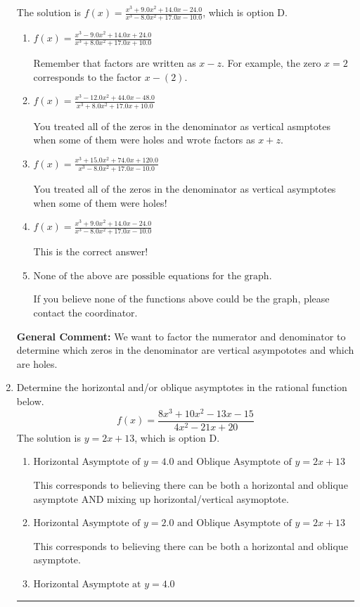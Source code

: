 \documentclass{extbook}[14pt]
\newcommand{\litem}[1]{\item #1

\rule{\textwidth}{0.4pt}}
\begin{document}
\begin{enumerate}
{The solution is \( f(x)=\frac{x^{3} +9.0 x^{2} +14.0 x -24.0}{x^{3} -8.0 x^{2} +17.0 x -10.0} \), which is option D.\begin{enumerate}[label=\Alph*.]
\item \( f(x)=\frac{x^{3} -9.0 x^{2} +14.0 x + 24.0}{x^{3} +8.0 x^{2} +17.0 x + 10.0} \)

Remember that factors are written as $x-z$. For example, the zero $x=2$ corresponds to the factor $x-(2)$.
\item \( f(x)=\frac{x^{3} -12.0 x^{2} +44.0 x -48.0}{x^{3} +8.0 x^{2} +17.0 x + 10.0} \)

You treated all of the zeros in the denominator as vertical asmptotes when some of them were holes and wrote factors as $x+z$.
\item \( f(x)=\frac{x^{3} +15.0 x^{2} +74.0 x + 120.0}{x^{3} -8.0 x^{2} +17.0 x -10.0} \)

You treated all of the zeros in the denominator as vertical asymptotes when some of them were holes!
\item \( f(x)=\frac{x^{3} +9.0 x^{2} +14.0 x -24.0}{x^{3} -8.0 x^{2} +17.0 x -10.0} \)

This is the correct answer!
\item \( \text{None of the above are possible equations for the graph.} \)

If you believe none of the functions above could be the graph, please contact the coordinator.
\end{enumerate}

\textbf{General Comment:} We want to factor the numerator and denominator to determine which zeros in the denominator are vertical asympototes and which are holes.
}
\litem{
Determine the horizontal and/or oblique asymptotes in the rational function below.
\[ f(x) = \frac{8x^{3} +10 x^{2} -13 x -15}{4x^{2} -21 x + 20} \]The solution is \( y = 2x + 13 \), which is option D.\begin{enumerate}[label=\Alph*.]
\item \( \text{Horizontal Asymptote of } y = 4.0 \text{ and Oblique Asymptote of } y = 2x + 13 \)

This corresponds to believing there can be both a horizontal and oblique asymptote AND mixing up horizontal/vertical asymoptote.
\item \( \text{Horizontal Asymptote of } y = 2.0 \text{ and Oblique Asymptote of } y = 2x + 13 \)

This corresponds to believing there can be both a horizontal and oblique asymptote.
\item \( \text{Horizontal Asymptote at } y = 4.0 \)


\end{enumerate}}
\end{enumerate}
\end{document}
